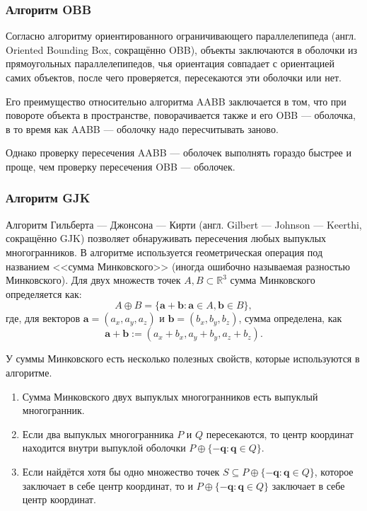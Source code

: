 \subsubsection{Алгоритм OBB}

Согласно алгоритму ориентированного ограничивающего параллелепипеда (англ. Oriented Bounding Box, сокращённо OBB), объекты заключаются в оболочки из прямоугольных параллелепипедов, чья ориентация совпадает с ориентацией самих объектов, после чего проверяется, пересекаются эти оболочки или нет. %

Его преимущество относительно алгоритма AABB заключается в том, что при повороте объекта в пространстве, поворачивается также и его OBB --- оболочка, в то время как AABB --- оболочку надо пересчитывать заново.

Однако проверку пересечения AABB --- оболочек выполнять гораздо быстрее и проще, чем проверку пересечения OBB --- оболочек.

\subsubsection{Алгоритм GJK}

Алгоритм Гильберта --- Джонсона --- Кирти (англ. Gilbert --- Johnson --- Keerthi, сокращённо GJK) позволяет обнаруживать пересечения любых выпуклых многогранников.
В алгоритме используется геометрическая операция под названием <<сумма Минковского>> (иногда ошибочно называемая разностью Минковского). %
Для двух множеств точек $A, B \subset \mathbb{R}^3$ сумма Минковского определяется как:
$$
A \oplus B = \{ \boldsymbol{a} + \boldsymbol{b} : \boldsymbol{a} \in A, \boldsymbol{b} \in B \},
$$
где, для векторов $\boldsymbol{a} = (a_x, a_y, a_z)$ и $\boldsymbol{b} = (b_x, b_y, b_z)$, сумма определена, как
$$
\boldsymbol{a} + \boldsymbol{b} := (a_x + b_x, a_y + b_y, a_z + b_z).
$$

У суммы Минковского есть несколько полезных свойств, которые используются в алгоритме.
\begin{enumerate}
    \item Сумма Минковского двух выпуклых многогранников есть выпуклый многогранник.
    \item Если два выпуклых многогранника $P$ и $Q$ пересекаются, то центр координат находится внутри выпуклой оболочки $P \oplus \{ -\boldsymbol{q} : \boldsymbol{q} \in Q \}$.
    \item Если найдётся хотя бы одно множество точек $S \subseteq P \oplus \{ -\boldsymbol{q} : \boldsymbol{q} \in Q \}$, которое заключает в себе центр координат, то и $P \oplus \{ -\boldsymbol{q} : \boldsymbol{q} \in Q \}$ заключает в себе центр координат.
\end{enumerate}

